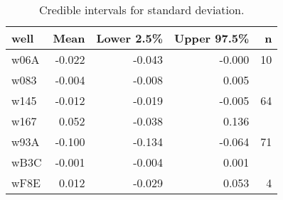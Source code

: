 \begin{table}[ht]
\centering
\begin{tabular}{lrrrr}
  \hline
well & Mean & Lower 2.5\% & Upper 97.5\% & n \\ 
  \hline
w06A & -0.022 & -0.043 & -0.000 &   10 \\ 
  w083 & -0.004 & -0.008 & 0.005 &  \\ 
  w145 & -0.012 & -0.019 & -0.005 &   64 \\ 
  w167 & 0.052 & -0.038 & 0.136 &  \\ 
  w93A & -0.100 & -0.134 & -0.064 &   71 \\ 
  wB3C & -0.001 & -0.004 & 0.001 &  \\ 
  wF8E & 0.012 & -0.029 & 0.053 &    4 \\ 
   \hline
\end{tabular}
\caption{Credible intervals for standard deviation.} 
\label{tab:sd}
\end{table}
